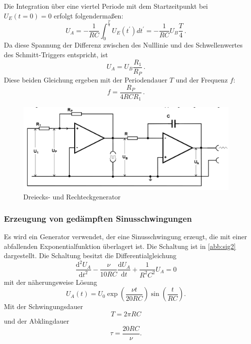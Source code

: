Die Integration über eine viertel Periode mit dem Startzeitpunkt bei $U_E(t=0) = 0$ erfolgt folgendermaßen:
\begin{equation}
U_A = - \frac{1}{RC} \int_{0}^{\frac{T}{4}} U_E(t^\prime)dt^\prime = -\frac{1}{RC} U_B \frac{T}{4} \,.
\label{integral}
\end{equation}
Da diese Spannung der Differenz zwischen des Nulllinie und des Schwellenwertes des Schmitt-Triggers entspricht, ist
\begin{equation}
U_A = U_B\frac{R_1}{R_P} \,.
\label{differenz}
\end{equation}
Diese beiden Gleichung ergeben mit der Periodendauer $T$ und der Frequenz $f$:
\begin{equation}
f = \frac{R_P}{4RCR_1} \,.
\label{frequenz}
\end{equation}
\begin{figure}[h!]
 	\centering
 	\includegraphics[width=\textwidth]{img/gen.png}
 	\caption{Dreiecks- und Rechteckgenerator \cite{FP}}
 	\label{abb:sig}
\end{figure}

\subsubsection{Erzeugung von ged{\"a}mpften Sinusschwingungen}
Es wird ein Generator verwendet, der eine Sinusschwingung erzeugt, die mit einer abfallenden Exponentialfunktion überlagert ist. Die Schaltung ist in \autoref{abb:sig2} dargestellt. Die Schaltung besitzt die Differentialgleichung
\begin{equation}
\frac{\text{d}^2 U_A}{\text{d}t^2} - \frac{\nu}{10RC} \frac{\text{d} U_A}{\text{d}t} + \frac{1}{R^2 C^2} U_A = 0
\end{equation}
mit der näherungsweise Lösung
\begin{equation}
U_A(t) = U_0 \exp\left(\frac{\nu t}{20 RC}\right) \sin\left(\frac{t}{RC}\right) .
\end{equation}
Mit der Schwingungsdauer
\begin{equation}
T = 2\pi RC
\end{equation}
und der Abklingdauer
\begin{equation}
\tau = \frac{20 RC}{\nu} .
\end{equation}

